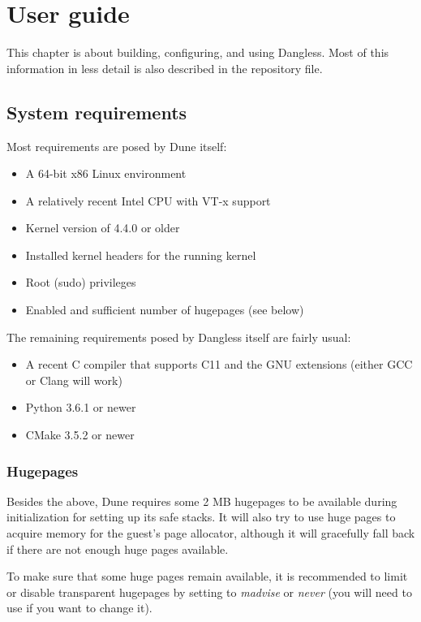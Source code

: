 \chapter{User guide}
\label{ch:user-guide}

This chapter is about building, configuring, and using Dangless.
Most of this information in less detail is also described in the repository  file.

\section{System requirements}

Most requirements are posed by Dune itself:

\begin{itemize}
	\item A 64-bit x86 Linux environment
	\item A relatively recent Intel CPU with VT-x support
	\item Kernel version of 4.4.0 or older
	\item Installed kernel headers for the running kernel
	\item Root (sudo) privileges
	\item Enabled and sufficient number of hugepages (see below)
\end{itemize}

The remaining requirements posed by Dangless itself are fairly usual:

\begin{itemize}
	\item A recent C compiler that supports C11 and the GNU extensions (either GCC or Clang will work)
	\item Python 3.6.1 or newer
	\item CMake 3.5.2 or newer
\end{itemize}

\subsection{Hugepages}

Besides the above, Dune requires some 2 MB hugepages to be available during initialization for setting up its safe stacks. It will also try to use huge pages to acquire memory for the guest's page allocator, although it will gracefully fall back if there are not enough huge pages available.

To make sure that some huge pages remain available, it is recommended to limit or disable transparent hugepages by setting  to \emph{madvise} or \emph{never} (you will need to use  if you want to change it).

